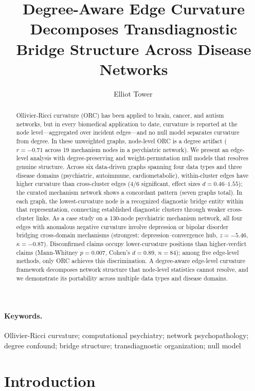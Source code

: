\documentclass[11pt]{article}
\title{Degree-Aware Edge Curvature Decomposes Transdiagnostic Bridge Structure Across Disease Networks}
\author{Elliot Tower\,\orcidlink{0000-0001-7004-8884}}
\affil{Independent researcher \\ \texttt{elliot@elliottower.ai}}
\date{}
\begin{document}
\maketitle

\begin{abstract}
Ollivier-Ricci curvature (ORC) has been applied to brain, cancer, and autism networks, but in every biomedical application to date, curvature is reported at the node level---aggregated over incident edges---and no null model separates curvature from degree. In these unweighted graphs, node-level ORC is a degree artifact ($r = -0.71$ across 19 mechanism nodes in a psychiatric network). We present an edge-level analysis with degree-preserving and weight-permutation null models that resolves genuine structure. Across six data-driven graphs spanning four data types and three disease domains (psychiatric, autoimmune, cardiometabolic), within-cluster edges have higher curvature than cross-cluster edges (4/6 significant, effect sizes $d = 0.46$--$1.55$); the curated mechanism network shows a concordant pattern (seven graphs total). In each graph, the lowest-curvature node is a recognized diagnostic bridge entity within that representation, connecting established diagnostic clusters through weaker cross-cluster links. As a case study on a 130-node psychiatric mechanism network, all four edges with anomalous negative curvature involve depression or bipolar disorder bridging cross-domain mechanisms (strongest: depression--convergence hub, $z = -5.46$, $\kappa = -0.87$). Disconfirmed claims occupy lower-curvature positions than higher-verdict claims (Mann-Whitney $p = 0.007$, Cohen's $d = 0.89$, $n = 84$); among five edge-level methods, only ORC achieves this discrimination. A degree-aware edge-level curvature framework decomposes network structure that node-level statistics cannot resolve, and we demonstrate its portability across multiple data types and disease domains.
\end{abstract}

\paragraph{Keywords.} Ollivier-Ricci curvature; computational psychiatry; network psychopathology; degree confound; bridge structure; transdiagnostic organization; null model

\section{Introduction}
\end{document}
